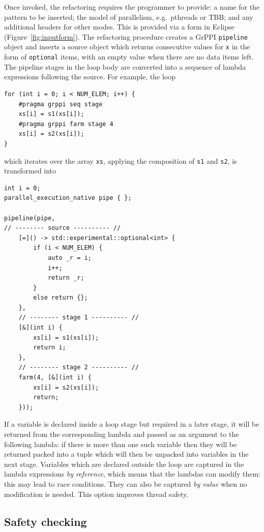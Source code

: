 Once invoked, the refactoring requires the programmer to provide: a name for the pattern to be inserted; the model of parallelism, e.g.\ pthreads or TBB; and any additional headers for other modes. This is provided via a form in Eclipse (Figure~\ref{fig:inputform}).
% 
The refactoring procedure creates a GrPPI \lstinline|pipeline| object and
inserts a source object which returns consecutive values for \texttt{x}
in the form of \texttt{optional} items, with an empty value when there
are no data items left.
% 
The pipeline stages in the loop body are converted into a sequence of
lambda expressions following the source.
% 
For example, the loop
% 
\begin{lstlisting}
for (int i = 0; i < NUM_ELEM; i++) {
    #pragma grppi seq stage
    xs[i] = s1(xs[i]);
    #pragma grppi farm stage 4
    xs[i] = s2(xs[i]);
}
\end{lstlisting}
% 
\noindent
which iterates over the array \texttt{xs}, applying the composition of \texttt{s1} and \texttt{s2}, is transformed into
% 
\begin{lstlisting}
int i = 0;
parallel_execution_native pipe { };

pipeline(pipe,
// -------- source ---------- //
    [=]() -> std::experimental::optional<int> {
    	if (i < NUM_ELEM) {
    		auto _r = i;
    		i++;
    		return _r;
    	} 
    	else return {};
    },
    // -------- stage 1 ---------- //
    [&](int i) {
    	xs[i] = s1(xs[i]);
    	return i;
    },
    // -------- stage 2 ---------- //
    farm(4, [&](int i) {
    	xs[i] = s2(xs[i]);
    	return;
    }));
\end{lstlisting}
%
If a variable is declared
inside a loop stage but required in a later stage, it will be returned
from the corresponding lambda and passed as an argument to the following
lambda: if there is more than one such variable then they will be
returned packed into a tuple which will then be unpacked into variables
in the next stage.
%
Variables which are declared outside the loop are captured in the lambda
expressions \emph{by reference}, which means that the lambdas can modify
them: this may lead to race conditions. They can also be captured \emph{by value} when no modification is needed. This option improves thread safety.

\subsection{Safety checking}\label{safety-checking}

